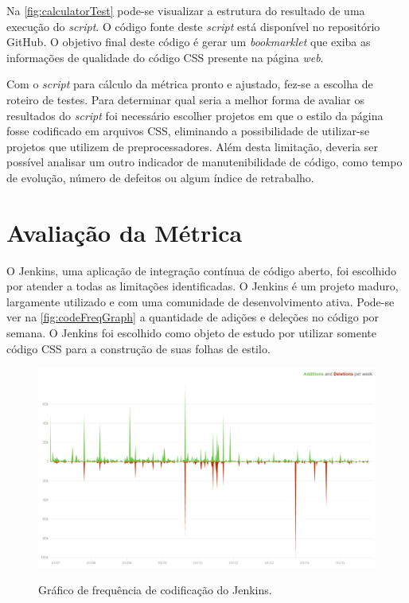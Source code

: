 Na \autoref{fig:calculatorTest} pode-se visualizar a estrutura do resultado de uma execução do \textit{script}. O código fonte deste \textit{script} está disponível no repositório GitHub\footnotemark. O objetivo final deste código é gerar um \textit{bookmarklet} que exiba as informações de qualidade do código CSS presente na página \textit{web}.


Com o \textit{script} para cálculo da métrica pronto e ajustado, fez-se a escolha de roteiro de testes. Para determinar qual seria a melhor forma de avaliar os resultados do \textit{script} foi necessário escolher projetos em que o estilo da página fosse codificado em arquivos CSS, eliminando a possibilidade de utilizar-se projetos que utilizem de preprocessadores\footnotemark. Além desta limitação, deveria ser possível analisar um outro indicador de manutenibilidade de código, como tempo de evolução, número de defeitos ou algum índice de retrabalho.


\chapter{Avaliação da Métrica}

O Jenkins\footnotemark, uma aplicação de integração contínua de código aberto, foi escolhido por atender a todas as limitações identificadas. O Jenkins é um projeto maduro, largamente utilizado e com uma comunidade de desenvolvimento ativa. Pode-se ver na \autoref{fig:codeFreqGraph} a quantidade de adições e deleções no código por semana. O Jenkins foi escolhido como objeto de estudo por utilizar somente código CSS para a construção de suas folhas de estilo.


\begin{figure}[!htb]
	\centering
	\caption{Gráfico de frequência de codificação do Jenkins.}
	\includegraphics[width=1\textwidth]{./04-figuras/code_freq_graph}
	\label{fig:codeFreqGraph}
\end{figure}

